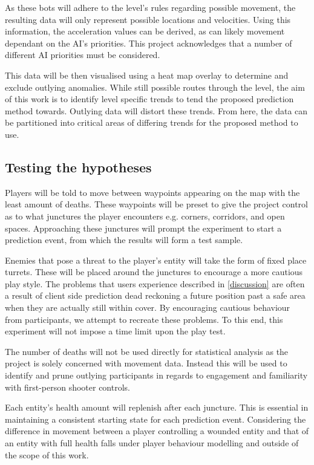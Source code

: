 \documentclass[journal]{IEEEtran}
\begin{document}
As these bots will adhere to the level's rules regarding possible movement, the resulting data will only represent possible locations and velocities. Using this information, the acceleration values can be derived, as can likely movement dependant on the AI's priorities. This project acknowledges that a number of different AI priorities must be considered.

This data will be then visualised using a heat map overlay to determine and exclude outlying anomalies. While still possible routes through the level, the aim of this work is to identify level specific trends to tend the proposed prediction method towards. Outlying data will distort these trends. From here, the data can be partitioned into critical areas of differing trends for the proposed method to use.

\subsection{Testing the hypotheses}

Players will be told to move between waypoints appearing on the map with the least amount of deaths. These waypoints will be preset to give the project control as to what junctures the player encounters e.g. corners, corridors, and open spaces. Approaching these junctures will prompt the experiment to start a prediction event, from which the results will form a test sample.

Enemies that pose a threat to the player's entity will take the form of fixed place turrets. These will be placed around the junctures to encourage a more cautious play style. The problems that users experience described in \ref{discussion} are often a result of client side prediction dead reckoning a future position past a safe area when they are actually still within cover. By encouraging cautious behaviour from participants, we attempt to recreate these problems. To this end, this experiment will not impose a time limit upon the play test.

The number of deaths will not be used directly for statistical analysis as the project is solely concerned with movement data. Instead this will be used to identify and prune outlying participants in regards to engagement and familiarity with first-person shooter controls.

Each entity's health amount will replenish after each juncture. This is essential in maintaining a consistent starting state for each prediction event. Considering the difference in movement between a player controlling a wounded entity and that of an entity with full health falls under player behaviour modelling and outside of the scope of this work.
	
\end{document}
